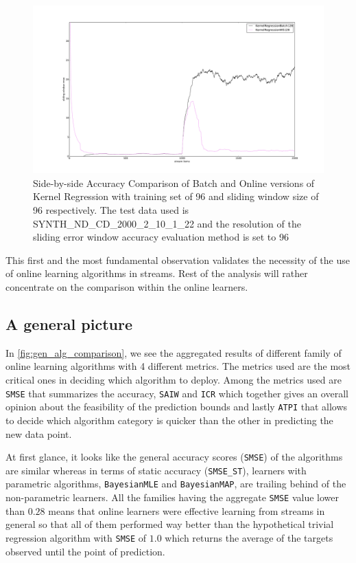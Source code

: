 \begin{figure}[htbp]
  \centering
    \includegraphics[width=\linewidth]{./Figures/batch_vs_online_sidebyside_comp_res96.pdf}
  \caption{Side-by-side Accuracy Comparison of Batch and Online versions of Kernel Regression with training set of 96 and sliding window size of 96 respectively. The test data used is SYNTH\_ND\_CD\_2000\_2\_10\_1\_22 and the resolution of the sliding error window accuracy evaluation method is set to 96}
  \label{fig:batch_vs_online_sidebyside_comp_res96}
\end{figure}

This first and the most fundamental observation validates the necessity of the use of online learning algorithms in streams. Rest of the analysis will rather concentrate on the comparison within the online learners.

\subsection{A general picture}

In \ref{fig:gen_alg_comparison}, we see the aggregated results of different family of online learning algorithms with 4 different metrics. The metrics used are the most critical ones in deciding which algorithm to deploy. Among the metrics used are \texttt{SMSE} that summarizes the accuracy, \texttt{SAIW} and \texttt{ICR} which together gives an overall opinion about the feasibility of the prediction bounds and lastly \texttt{ATPI} that allows to decide which algorithm category is quicker than the other in predicting the new data point. 

At first glance, it looks like the general accuracy scores (\texttt{SMSE}) of the algorithms are similar whereas in terms of static accuracy (\texttt{SMSE\_ST}), learners with parametric algorithms, \texttt{BayesianMLE} and \texttt{BayesianMAP}, are trailing behind of the non-parametric learners. All the families having the aggregate \texttt{SMSE} value lower than $0.28$ means that online learners were effective learning from streams in general so that all of them performed way better than the hypothetical trivial regression algorithm with \texttt{SMSE} of $1.0$ which returns the average of the targets observed until the point of prediction.

